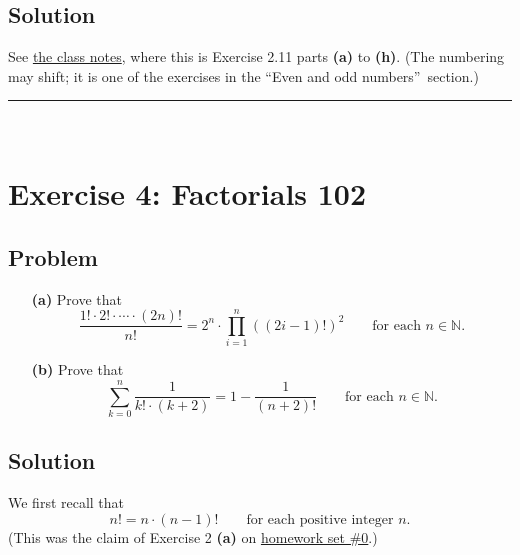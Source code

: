 \documentclass[paper=a4, fontsize=12pt]{scrartcl}%
\let\sumnonlimits\sum
\let\prodnonlimits\prod
\renewcommand{\sum}{\sumnonlimits\limits}
\renewcommand{\prod}{\prodnonlimits\limits}
\theoremstyle{plainsl}
\theoremstyle{definition}
\theoremstyle{remark}
\begin{document}
\subsection{Solution}

See \href{http://www-users.math.umn.edu/~dgrinber/19s/notes.pdf}{the class
notes}, where this is Exercise 2.11 parts \textbf{(a)} to \textbf{(h)}. (The
numbering may shift; it is one of the exercises in the \textquotedblleft Even
and odd numbers\textquotedblright\ section.)

\rule{\linewidth}{0.3pt} \\[0.4cm]

\section{Exercise 4: Factorials 102}

\subsection{Problem}

\begin{enumerate}
\item[\textbf{(a)}] Prove that
\[
\dfrac{1! \cdot2! \cdot\cdots\cdot\left(  2n \right)  !}{n!} = 2^{n}
\cdot\prod_{i=1}^{n} \left(  \left(  2i-1 \right)  ! \right)  ^{2}
\qquad\text{for each } n \in\mathbb{N} .
\]


\item[\textbf{(b)}] Prove that
\[
\sum_{k=0}^{n} \dfrac{1}{k! \cdot\left(  k+2 \right)  } = 1 - \dfrac
{1}{\left(  n+2 \right)  !} \qquad\text{for each } n \in\mathbb{N} .
\]

\end{enumerate}

\subsection{Solution}

We first recall that%
\begin{equation}
n!=n\cdot\left(  n-1\right)  !\qquad\text{for each positive integer }n.
\label{sol.factorials.102.fac-rec}%
\end{equation}
(This was the claim of Exercise 2 \textbf{(a)} on
\href{http://www-users.math.umn.edu/~dgrinber/19s/hw0s.pdf}{homework set \#0}.)
\end{document}
